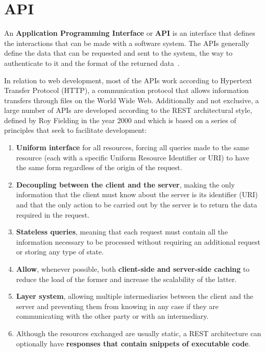 \section{API}

\nonzeroparskip An \textbf{Application Programming Interface} or \textbf{API} is an interface that defines the interactions that can be made with a software system. The APIs generally define the data that can be requested and sent to the system, the way to authenticate to it and the format of the returned data~\cite{ibm_restapi}.

\nonzeroparskip In relation to web development, most of the APIs work according to Hypertext Transfer Protocol (HTTP), a communication protocol that allows information transfers through files on the World Wide Web. Additionally and not exclusive, a large number of APIs are developed according to the REST architectural style, defined by Roy Fielding in the year 2000 and which is based on a series of principles that seek to facilitate development:
\begin{enumerate}
	\item \textbf{Uniform interface} for all resources, forcing all queries made to the same resource (each with a specific Uniform Resource Identifier or URI) to have the same form regardless of the origin of the request.
	\item \textbf{Decoupling between the client and the server}, making the only information that the client must know about the server is its identifier (URI) and that the only action to be carried out by the server is to return the data required in the request.
	\item \textbf{Stateless queries}, meaning that each request must contain all the information necessary to be processed without requiring an additional request or storing any type of state.
	\item \textbf{Allow}, whenever possible, both \textbf{client-side and server-side caching} to reduce the load of the former and increase the scalability of the latter.
	\item \textbf{Layer system}, allowing multiple intermediaries between the client and the server and preventing them from knowing in any case if they are communicating with the other party or with an intermediary.
	\item Although the resources exchanged are usually static, a REST architecture can optionally have \textbf{responses that contain snippets of executable code}.
\end{enumerate}

